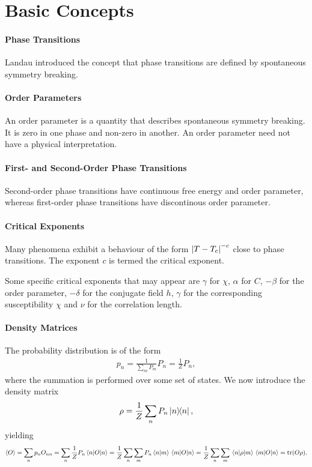 \section{Basic Concepts}

\paragraph{Phase Transitions}
Landau introduced the concept that phase transitions are defined by spontaneous symmetry breaking.

\paragraph{Order Parameters}
An order parameter is a quantity that describes spontaneous symmetry breaking. It is zero in one phase and non-zero in another. An order parameter need not have a physical interpretation.

\paragraph{First- and Second-Order Phase Transitions}
Second-order phase transitions have continuous free energy and order parameter, whereas first-order phase transitions have discontinous order parameter.

\paragraph{Critical Exponents}
Many phenomena exhibit a behaviour of the form $\abs{T - T_{\text{c}}}^{-c}$ close to phase transitions. The exponent $c$ is termed the critical exponent.

Some specific critical exponents that may appear are $\gamma$ for $\chi$, $\alpha$ for $C$, $-\beta$ for the order parameter, $-\delta$ for the conjugate field $h$, $\gamma$ for the corresponding susceptibility $\chi$ and $\nu$ for the correlation length.

\paragraph{Density Matrices}
The probability distribution is of the form
\begin{align*}
	p_{n} = \frac{1}{\sum\limits_{m}P_{m}}P_{n} = \frac{1}{Z}P_{n},
\end{align*}
where the summation is performed over some set of states. We now introduce the density matrix
\begin{align*}
	\rho = \frac{1}{Z}\sum\limits_{n}P_{n}\op{n}{n},
\end{align*}
yielding
\begin{align*}
	\expval{O} = \sum\limits_{n}p_{n}O_{nn} = \sum\limits_{n}\frac{1}{Z}P_{n}\expval{O}{n} = \frac{1}{Z}\sum\limits_{n}\sum\limits_{m}P_{n}\braket{n}{m}\mel{m}{O}{n} = \frac{1}{Z}\sum\limits_{n}\sum\limits_{m}\mel{n}{\rho}{m}\mel{m}{O}{n} = \tr(O\rho).
\end{align*}

